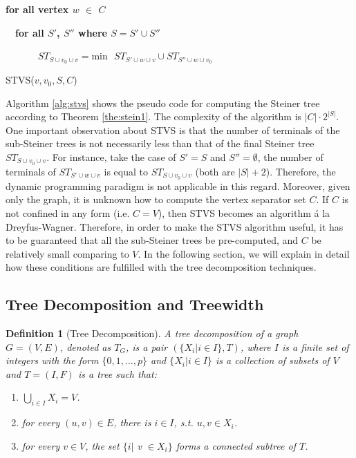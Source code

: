 \documentclass[preprint,12pt]{elsarticle}
\newtheorem{definition}{Definition}
\begin{document}
\begin{algorithm}
\begin{algorithmic}

\bf{for all} {vertex $w$ $\in$ $C$}

~~\bf{for all} {$S'$, $S''$ where  $S = S' \cup S''$}

~~~~~~ {$ST_{S \cup v_0 \cup v} = {\mbox{min}} ~~~ ST_{S' \cup w \cup v}  \cup ST_{S'' \cup w \cup v_0}$}
\end{algorithmic}
\caption{STVS($v, v_0, S, C$)}
\label{alg:stvs}
\end{algorithm}

Algorithm \ref{alg:stvs} shows the pseudo code for computing the Steiner tree according 
to Theorem \ref{the:stein1}. The complexity of the algorithm is $|C| \cdot 2^{|S|}$.
One important observation about STVS   is that
the number of terminals of the sub-Steiner trees is not necessarily less than
that of the final Steiner tree $ST_{S \cup v_0 \cup v}$. 
For instance, take the case of $S' = S$ and $S'' = \emptyset$,
the number of terminals of $ST_{S' \cup w \cup v}$ is equal to 
$ST_{S \cup v_0 \cup v}$ (both are $|S|+2$). Therefore, the dynamic programming
paradigm is not applicable in this regard.
Moreover, given only the graph, it is unknown how to compute the vertex separator set $C$.
If $C$ is not confined in any form (i.e. $C=V$), then  STVS becomes
an algorithm \'a la Dreyfus-Wagner.
Therefore, in order to make the STVS algorithm useful, it has to be guaranteed that all 
the sub-Steiner trees be pre-computed, and $C$ be relatively small comparing to $V$.
In the following section, we will explain in detail how these conditions 
are fulfilled with the tree decomposition techniques. 

\subsection{Tree Decomposition and Treewidth}


\begin{definition} [Tree Decomposition]
A tree decomposition  of a graph $G = (V, E)$, denoted as $T_G$, is a pair $(\{X_i | i \in I\}, T)$, where $I$ is a finite set of integers with the form $\{0, 1, \ldots, p\}$ and $\{X_i | i \in I\}$ is a collection of subsets of $V$ and $T = (I,F)$ is a tree such that:
\begin{enumerate}
	\item  $\bigcup_{i \in I} X_i = V$.
	\item for every $(u, v) \in E$, there is $i \in I$, s.t. $u, v \in X_i$.
	\item for every $v \in V$, the set  $\{i \vert$ v $\in X_i\}$ forms a connected subtree of  $T$.
\end{enumerate}
\label{def:TD}
\end{definition}
\end{document}
